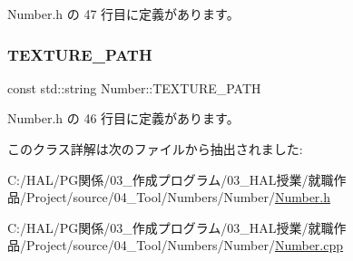  Number.\+h の 47 行目に定義があります。

\mbox{\label{class_number_a0018ed63d70f4dde3c64bf99df7978ce}} 
\subsubsection{\texorpdfstring{T\+E\+X\+T\+U\+R\+E\+\_\+\+P\+A\+TH}{TEXTURE\_PATH}}
{\footnotesize\ttfamily const std\+::string Number\+::\+T\+E\+X\+T\+U\+R\+E\+\_\+\+P\+A\+TH\hspace{0.3cm}{\ttfamily [static]}}



 Number.\+h の 46 行目に定義があります。



このクラス詳解は次のファイルから抽出されました\+:\begin{DoxyCompactItemize}
\item 
C\+:/\+H\+A\+L/\+P\+G関係/03\+\_\+作成プログラム/03\+\_\+\+H\+A\+L授業/就職作品/\+Project/source/04\+\_\+\+Tool/\+Numbers/\+Number/\mbox{\hyperlink{_number_8h}{Number.\+h}}\item 
C\+:/\+H\+A\+L/\+P\+G関係/03\+\_\+作成プログラム/03\+\_\+\+H\+A\+L授業/就職作品/\+Project/source/04\+\_\+\+Tool/\+Numbers/\+Number/\mbox{\hyperlink{_number_8cpp}{Number.\+cpp}}\end{DoxyCompactItemize}
